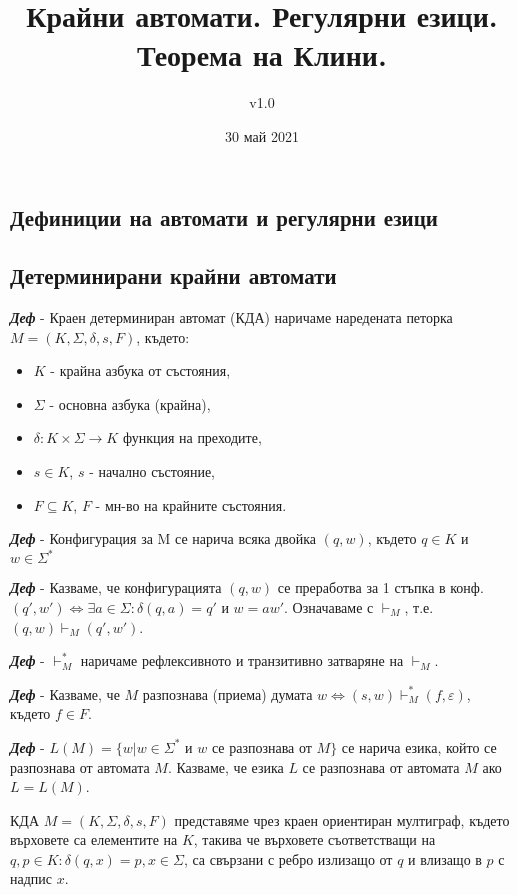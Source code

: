 \documentclass[fleqn,12pt]{article}
\title{Крайни автомати. Регулярни езици. Теорема на Клини.}
\author{v1.0}
\date{30 май 2021}
\begin{document}
\maketitle

\tableofcontents
\pagebreak
\begin{flushleft}

\section{Дефиниции на автомати и регулярни езици}
\subsection{Детерминирани крайни автомати}

\textit{\textbf{Деф}} - Краен детерминиран автомат (КДА) наричаме наредената петорка $M = (K, \Sigma, \delta, s, F)$, където:
\begin{itemize}
    \item $K$ - крайна азбука от състояния,
    \item $\Sigma$ - основна азбука (крайна),
    \item $\delta : K \times \Sigma \rightarrow K$ функция на преходите,
    \item $s \in K$, $s$ - начално състояние,
    \item $F \subseteq K$, $F$ - мн-во на крайните състояния.
\end{itemize}

\textit{\textbf{Деф}} - Конфигурация за M се нарича всяка двойка $(q, w)$, където $q \in K$ и $w \in \Sigma^*$

\textit{\textbf{Деф}} - Казваме, че конфигурацията $(q, w)$ се преработва за 1 стъпка в конф. $(q', w') \iff \exists a \in \Sigma : \delta(q, a) = q'$ и $w = aw'$. Означаваме с $\vdash_M$, т.е. $(q, w) \vdash_M (q', w')$.

\textit{\textbf{Деф}} - $\vdash_M^*$ наричаме рефлексивното и транзитивно затваряне на $\vdash_M$.

\textit{\textbf{Деф}} - Казваме, че $M$ разпознава (приема) думата $w \iff (s, w) \vdash_M^* (f, \varepsilon)$, където $f \in F$.

\textit{\textbf{Деф}} - $L(M) = \{w | w \in \Sigma^*$ и $w$ се разпознава от $M\}$ се нарича езика, който се разпознава от автомата $M$. Казваме, че езика $L$ се разпознава от автомата $M$ ако $L = L(M)$.

КДА $M = (K, \Sigma, \delta, s, F)$ представяме чрез краен ориентиран мултиграф, където върховете са елементите на $K$, такива че върховете съответстващи на $q, p \in K: \delta(q, x) = p, x \in \Sigma$, са свързани с ребро излизащо от $q$ и влизащо в $p$ с надпис $x$.


\end{flushleft}
\end{document}
